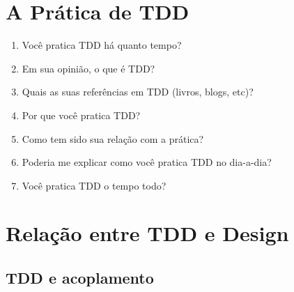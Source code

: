 \section{A Prática de TDD}
\label{entrevista:pratica}

\begin{enumerate}
	\item Você pratica TDD há quanto tempo?

	\item Em sua opinião, o que é TDD?
	
	\item Quais as suas referências em TDD (livros, blogs, etc)?

	\item Por que você pratica TDD?

	\item Como tem sido sua relação com a prática?

	\item Poderia me explicar como você pratica TDD no dia-a-dia?

	\item Você pratica TDD o tempo todo?
\end{enumerate}

\section{Relação entre TDD e Design}

\subsection{TDD e acoplamento}
\label{entrevista:acoplamento}


